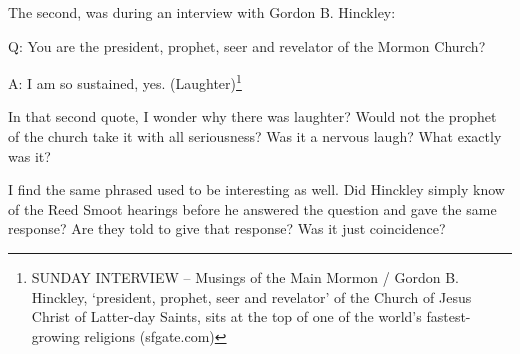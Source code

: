 The second, was during an interview with Gordon B. Hinckley:

\begin{displayquote}
Q: You are the president, prophet, seer and revelator of the Mormon Church?

A: I am so sustained, yes. (Laughter)\footnote{SUNDAY INTERVIEW -- Musings of the 
Main Mormon / Gordon B. Hinckley, `president, prophet, seer and revelator' of the 
Church of Jesus Christ of Latter-day Saints, sits at the top of one of the world's 
fastest-growing religions (sfgate.com) }
\end{displayquote}

In that second quote, I wonder why there was laughter? Would not the prophet of the
church take it with all seriousness? Was it a nervous laugh? What exactly was it?

I find the same phrased used to be interesting as well. Did Hinckley simply know of
the Reed Smoot hearings before he answered the question and gave the same response?
Are they told to give that response? Was it just coincidence?
